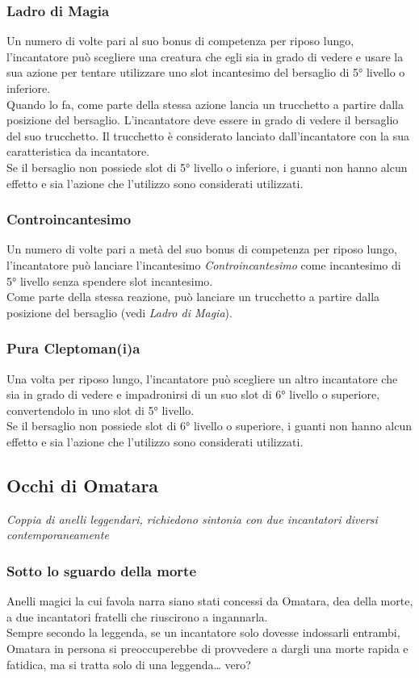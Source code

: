 \subsubsection{Ladro di Magia}
Un numero di volte pari al suo bonus di competenza per riposo lungo, l'incantatore può scegliere una creatura che egli sia in grado di vedere e usare la sua azione per tentare utilizzare uno slot incantesimo del bersaglio di 5° livello o inferiore. \\
Quando lo fa, come parte della stessa azione lancia un trucchetto a partire dalla posizione del bersaglio. L'incantatore deve essere in grado di vedere il bersaglio del suo trucchetto. Il trucchetto è considerato lanciato dall'incantatore con la sua caratteristica da incantatore. \\ Se il bersaglio non possiede slot di 5° livello o inferiore, i guanti non hanno alcun effetto e sia l'azione che l'utilizzo sono considerati utilizzati.

\subsubsection{Controincantesimo}
Un numero di volte pari a metà del suo bonus di competenza per riposo lungo, l'incantatore può lanciare l'incantesimo \textit{Controincantesimo} come incantesimo di 5° livello senza spendere slot incantesimo. \\ Come parte della stessa reazione, può lanciare un trucchetto a partire dalla posizione del bersaglio (vedi \textit{Ladro di Magia}).

\subsubsection{Pura Cleptoman(i)a}
Una volta per riposo lungo, l'incantatore può scegliere un altro incantatore che sia in grado di vedere e impadronirsi di un suo slot di 6° livello o superiore, convertendolo in uno slot di 5° livello. \\ Se il bersaglio non possiede slot di 6° livello o superiore, i guanti non hanno alcun effetto e sia l'azione che l'utilizzo sono considerati utilizzati.

\subsection{Occhi di Omatara}
\textit{Coppia di anelli leggendari, richiedono sintonia con due incantatori diversi contemporaneamente}

\subsubsection{Sotto lo sguardo della morte}
Anelli magici la cui favola narra siano stati concessi da Omatara, dea della morte, a due incantatori fratelli che riuscirono a ingannarla. \\ Sempre secondo la leggenda, se un incantatore solo dovesse indossarli entrambi, Omatara in persona si preoccuperebbe di provvedere a dargli una morte rapida e fatidica, ma si tratta solo di una leggenda… vero? 

